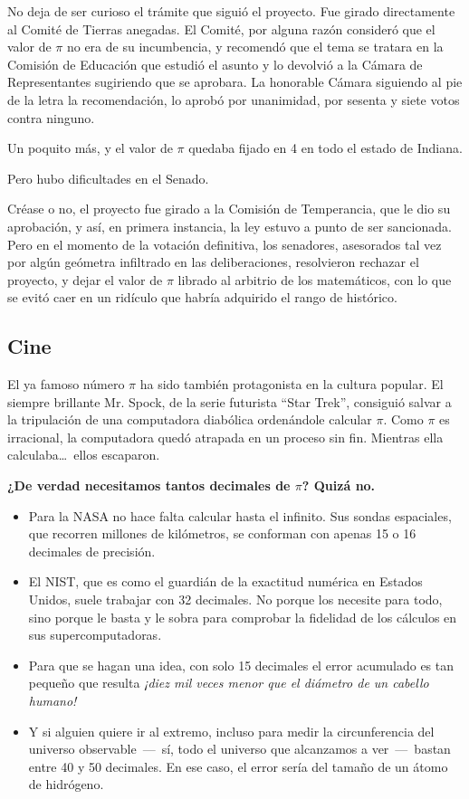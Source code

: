No deja de ser curioso el trámite que siguió el proyecto. Fue girado directamente al Comité de Tierras anegadas. El Comité, 
por alguna razón consideró que el valor de $\pi$ no era de su incumbencia, y recomendó que el tema se tratara en la Comisión 
de Educación que estudió el asunto y lo devolvió a la Cámara de Representantes sugiriendo que se aprobara. La honorable Cámara siguiendo 
al pie de la letra la recomendación, lo aprobó por unanimidad, por sesenta y siete votos contra ninguno.

Un poquito más, y el valor de $\pi$ quedaba fijado en 4 en todo el estado de Indiana. 

Pero hubo dificultades en el Senado.

Créase o no, el proyecto fue girado a la Comisión de Temperancia, que le dio su aprobación, y así, en primera instancia, 
la ley estuvo a punto de ser sancionada. Pero en el momento de la votación definitiva, los senadores, asesorados tal vez por algún 
geómetra infiltrado en las deliberaciones, resolvieron rechazar el proyecto, y dejar el valor de $\pi$ librado al arbitrio de los matemáticos, 
con lo que se evitó caer en un ridículo que habría adquirido el rango de histórico.

\subsection*{Cine}
El ya famoso número $\pi$ ha sido también protagonista en la cultura popular. El siempre brillante Mr. Spock, de la serie futurista ``Star Trek'', consiguió 
salvar a la tripulación de una computadora diabólica ordenándole calcular $\pi$. Como $\pi$ es irracional, la computadora quedó 
atrapada en un proceso sin fin. Mientras ella calculaba\ldots\ ellos escaparon.
\clearpage

\begin{center}
\textbf{¿De verdad necesitamos tantos decimales de $\pi$? Quizá no.}
\end{center}

\begin{itemize}
  \item Para la NASA no hace falta calcular hasta el infinito. Sus sondas espaciales, que recorren millones de kilómetros, se conforman con apenas 15 o 16 decimales de precisión.
  \item El NIST, que es como el guardián de la exactitud numérica en Estados Unidos, suele trabajar con 32 decimales. No porque los necesite para todo, sino porque le basta y le sobra para comprobar la fidelidad de los cálculos en sus supercomputadoras.
  \item Para que se hagan una idea, con solo 15 decimales el error acumulado es tan pequeño que resulta \emph{¡diez mil veces menor que el diámetro de un cabello humano!}
  \item Y si alguien quiere ir al extremo, incluso para medir la circunferencia del universo observable \,---\, sí, todo el universo que alcanzamos a ver \,---\, bastan entre 40 y 50 decimales. En ese caso, el error sería del tamaño de un átomo de hidrógeno.
\end{itemize}

